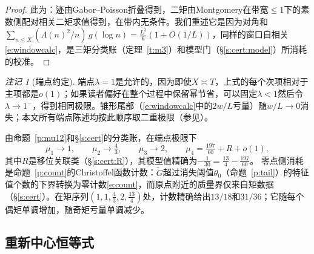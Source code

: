 \documentclass[11pt]{article}
\numberwithin{equation}{section}
\theoremstyle{definition}
\theoremstyle{remark}
\newtheorem{remark}[theorem]{注记}
\newcommand{\LL}{\Lambda}
\begin{document}
\begin{proof}
此为\cite[命题5.3和定理5.8]{C26}：迹由Gabor--Poisson折叠得到，二矩由Montgomery在带宽$\le1$下的素数侧配对相关二矩求值得到，在带内无条件\cite{Mon73,BGST}。我们重述它是因为对角和$\sum_{n\le X}(\LL(n)^{2}/n)\,g(\log n)
=\tfrac{L^{3}}{6}(1+O(1/L))$，同样的窗口自相关\eqref{e:windowcalc}，是三矩分类账（定理~\ref{t:m3}）和模型门（\S\ref{s:cert:model}）所消耗的校准。
\end{proof}

\begin{remark}[端点约定]\label{r:endpoint}
端点$\lambda=1$是允许的，因为即使$X\asymp T$，上式的每个次项相对于主项都是$o(1)$；如果读者偏好在整个过程中保留幂节省，可以固定$\lambda<1$然后令$\lambda\to1^-$，得到相同极限\cite[注6.1]{C26}。锥形尾部（\eqref{e:windowcalc}中的$2w/L$亏量）随$w/L\to0$消失；本文所有端点陈述均按此顺序取二重极限（参见\cite[\S7.1]{C26}）。
\end{remark}

由命题~\ref{p:mu12}和\S\ref{s:cert}的分类账，在端点极限下
\begin{equation}\label{e:moments}
\mu_1\to1,\qquad \mu_2\to\tfrac43,\qquad \mu_3\to2,\qquad
\mu_4=\tfrac{197}{60}+R+o(1),
\end{equation}
其中$R$是移位关联类（\S\ref{s:cert:R}），其模型值精确为$-\tfrac1{30}=\tfrac{13}4-\tfrac{197}{60}$。
零点侧消耗是命题~\ref{p:count}的Christoffel函数计数：$\widetilde G$超过消失阈值$\theta_0$（命题~\ref{p:tail}）的特征值个数的下界转换为零计数\eqref{e:count}，而原点附近的质量界仅来自矩数据（\S\ref{s:cert}）。在矩序列$(1,1,\tfrac43,2,\tfrac{13}4)$处，计数精确给出$13/18$和$31/36$；它随每个偶矩单调增加，随奇矩亏量单调减少。

\subsection{重新中心恒等式}\label{s:recentre}
\end{document}
